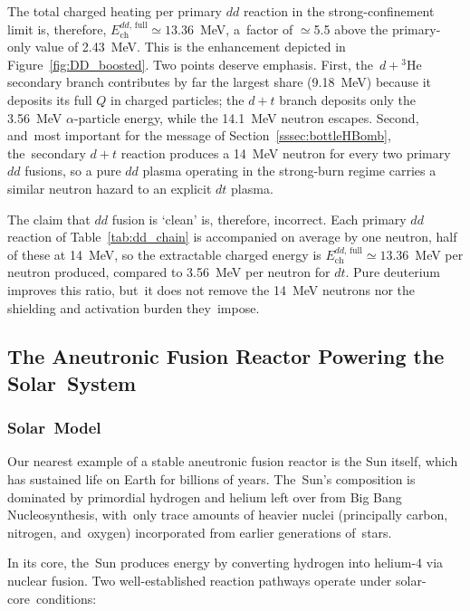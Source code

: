 \documentclass[particles,article,accept,pdftex,moreauthors]{Definitions/mdpi}
\begin{document}
The total charged heating per primary $dd$ reaction in the strong-confinement limit is, therefore, $E_\mathrm{ch}^{dd,\,\mathrm{full}}\simeq 13.36$~MeV, a~factor of $\simeq$5.5 above the primary-only value of 2.43~MeV. This is the enhancement depicted in Figure~\ref{fig:DD_boosted}. Two points deserve emphasis. First, the~$d+{}^3\mathrm{He}$ secondary branch contributes by far the largest share (9.18~MeV) because it deposits its full $Q$ in charged particles; the $d+t$ branch deposits only the 3.56~MeV $\alpha$-particle energy, while the 14.1~MeV neutron escapes. Second, and~most important for the message of Section~\ref{sssec:bottleHBomb}, the~secondary $d+t$ reaction produces a 14~MeV neutron for every two primary $dd$ fusions, so a pure $dd$ plasma operating in the strong-burn regime carries a similar neutron hazard to an explicit $dt$ plasma.

The claim that $dd$ fusion is `clean' is, therefore, incorrect. Each primary $dd$ reaction of Table~\ref{tab:dd_chain} is accompanied on average by one neutron, half of these at 14~MeV, so the extractable charged energy is $E_\mathrm{ch}^{dd,\,\mathrm{full}}\simeq13.36$~MeV per neutron produced, compared to 3.56~MeV per neutron for $dt$. Pure deuterium improves this ratio, but~it does not remove the 14~MeV neutrons nor the shielding and activation burden they~impose.

\subsection{The Aneutronic Fusion Reactor Powering the Solar~System}\label{ssec:SolarFusion}
\subsubsection{Solar~Model}\label{sssec:Solar}
Our nearest example of a stable aneutronic fusion reactor is the Sun itself, which has sustained life on Earth for billions of years. The~Sun's composition is dominated by primordial hydrogen and helium left over from Big Bang Nucleosynthesis, with~only trace amounts of heavier nuclei (principally carbon, nitrogen, and~oxygen) incorporated from earlier generations of~stars.

In its core, the~Sun produces energy by converting hydrogen into helium-4 via nuclear fusion. Two well-established reaction pathways operate under solar-core~conditions:
\end{document}
